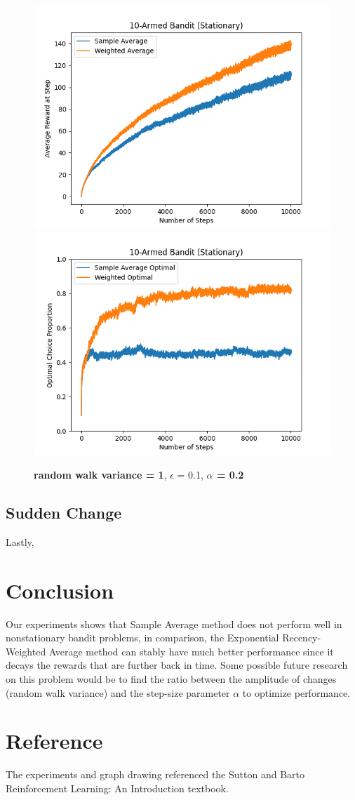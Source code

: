 \documentclass{article}
\begin{document}
\begin{figure}[h!]
\centering
\includegraphics[scale=.6]{RL_A1_pics/alpha/walk1alpha0.2.png}
\includegraphics[scale=.6]{RL_A1_pics/alpha/optimal/walk1alpha0.2.png}
\caption{\textbf{random walk variance = 1}, $\epsilon$ = 0.1, \textbf{$\alpha$ = 0.2}}
\label{fig:10-Armed1}
\end{figure}


\subsection{Sudden Change}
Lastly, 


\newpage
\section{Conclusion}
Our experiments shows that Sample Average method does not perform well in nonstationary bandit problems, in comparison, the Exponential Recency-Weighted Average method can stably have much better performance since it decays the rewards that are further back in time. Some possible future research on this problem would be to find the ratio between the amplitude of changes (random walk variance) and the step-size parameter $\alpha$ to optimize performance.

\section{Reference}
The experiments and graph drawing referenced the Sutton and Barto Reinforcement Learning: An Introduction textbook.



\end{document}
